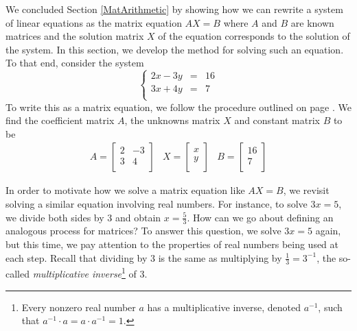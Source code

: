 \documentclass{ximera}
\begin{document}
	\author{Stitz-Zeager}




\setcounter{footnote}{0}

\label{MatMethods}

\setlength{\extrarowheight}{0pt}

We concluded Section \ref{MatArithmetic} by showing how we can rewrite a system of linear equations as the matrix equation $AX=B$ where $A$ and $B$ are known matrices and the solution matrix $X$ of the equation corresponds to the solution of the system. In this section, we develop the method for solving such an equation.  To that end, consider the system \[ \left\{ \begin{array}{rcr} 2x-3y & = & 16 \\ 3x+4y & = & 7 \\ \end{array} \right.\]  To write this as a matrix equation, we follow the procedure outlined on page \pageref{systemasmatrixeqn}.  We find the coefficient matrix $A$, the unknowns matrix $X$ and constant matrix $B$ to be 
\[ \begin{array}{ccc} 

A = \left[ \begin{array}{rr} 2 & -3 \\ 3 & 4 \\ \end{array} \right] 

&

 X = \left[ \begin{array}{r} x \\ y \\ \end{array} \right]
 
&

 B = \left[ \begin{array}{r} 16 \\ 7 \\ \end{array} \right] 
 \end{array}\]   
 
In order to motivate how we solve a matrix equation like $AX = B$, we revisit solving a similar equation involving real numbers. For instance, to solve  $3x = 5$,  we  divide both sides by $3$ and obtain $x = \frac{5}{3}$.  How can we go about defining an analogous process for matrices? To answer this question, we solve $3x=5$ again, but this time, we pay attention to the properties of real numbers being used at each step.  Recall that dividing by $3$ is the same as multiplying by $\frac{1}{3} = 3^{-1}$, the so-called \textit{multiplicative inverse}\footnote{Every nonzero real number $a$ has a multiplicative inverse, denoted $a^{-1}$, such that  $a^{-1} \cdot a = a \cdot a^{-1} = 1$.} of $3$.
\end{document}
